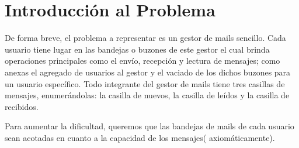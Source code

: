      \chapter{Introducción al Problema}
\begin{vplace}[0.7]
De forma breve, el problema a representar es un gestor de mails sencillo. Cada usuario tiene lugar en las bandejas o buzones de este gestor el cual brinda operaciones principales como el envío, recepción y lectura de mensajes; como anexas el agregado de usuarios al gestor y el vaciado de los dichos buzones para un usuario específico. Todo integrante del gestor de mails tiene tres casillas de mensajes, enumerándolas: la casilla de nuevos, la casilla de leídos y la casilla de recibidos.

Para aumentar la dificultad, queremos que las  bandejas de mails de cada usuario sean acotadas en cuanto a la capacidad de los mensajes( axiomáticamente). 

\end{vplace}


